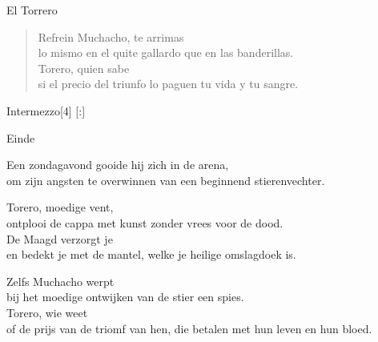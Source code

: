 \begin{song}{El Torrero}
\begin{verse}{Refrein}
Muchacho, te arrimas\\
lo mismo en el quite gallardo que en las banderillas.\\
Torero,  quien sabe \\
si el precio del triunfo lo paguen tu vida y tu sangre.
\end{verse}

\begin{instrumental}{Intermezzo}[4]
   [:]
 
\end{instrumental}

\begin{instrumental}{Einde}
 
\end{instrumental}
\end{song}

\begin{translation}
Een zondagavond gooide hij zich in de arena,\\
om zijn angsten te overwinnen van een beginnend stierenvechter.\vspace{\wlskip}

Torero, moedige vent,\\
ontplooi de cappa met kunst zonder vrees voor de dood.\\
De Maagd verzorgt je\\
en bedekt je met de mantel, welke je heilige omslagdoek is.\vspace{\wlskip}

Zelfs Muchacho werpt\\
bij het moedige ontwijken van de stier een spies.\\
Torero, wie weet\\
of de prijs van de triomf van hen, die betalen met hun leven en hun
bloed.
\end{translation}

